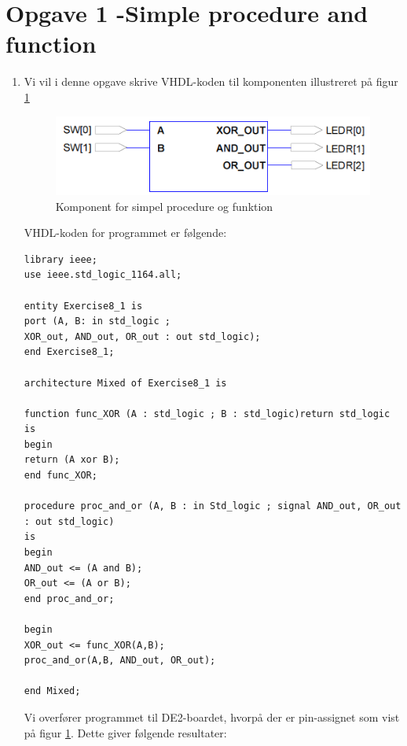\section{Opgave 1 -Simple procedure and function}
\begin{enumerate}
	\item[1)]
	
	Vi vil i denne opgave skrive VHDL-koden til komponenten illustreret på figur \ref{fig:component}
	\begin{figure}[h]
		\centering
		\includegraphics[scale=0.9]{pictures/Oevelse8/opg1/components}
		\caption{Komponent for simpel procedure og funktion}
		\label{fig:component}
	\end{figure}
	
	VHDL-koden for programmet er følgende:
	
\begin{lstlisting}[caption={Kode for simple procedure and function},label={lst:opg1_1}]
library ieee;
use ieee.std_logic_1164.all;

entity Exercise8_1 is
port (A, B: in std_logic ;
XOR_out, AND_out, OR_out : out std_logic);
end Exercise8_1;

architecture Mixed of Exercise8_1 is

function func_XOR (A : std_logic ; B : std_logic)return std_logic is
begin 
return (A xor B);
end func_XOR;

procedure proc_and_or (A, B : in Std_logic ; signal AND_out, OR_out : out std_logic) 
is 
begin 
AND_out <= (A and B);
OR_out <= (A or B);
end proc_and_or;

begin 
XOR_out <= func_XOR(A,B);
proc_and_or(A,B, AND_out, OR_out);

end Mixed;
\end{lstlisting}

Vi overfører programmet til DE2-boardet, hvorpå der er pin-assignet som vist på figur \ref{fig:component}. Dette giver følgende resultater:


\end{enumerate}
